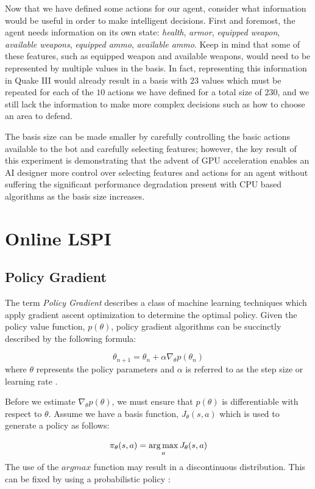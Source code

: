 Now that we have defined some actions for our agent, consider what information would be useful in order to make intelligent decisions. First and foremost, the agent needs information on its own state: \emph{health}, \emph{armor}, \emph{equipped weapon}, \emph{available weapons}, \emph{equipped ammo}, \emph{available ammo}. Keep in mind that some of these features, such as equipped weapon and available weapons, would need to be represented by multiple values in the basis. In fact, representing this information in Quake III would already result in a basis with $23$ values which must be repeated for each of the $10$ actions we have defined for a total size of $230$, and we still lack the information to make more complex decisions such as how to choose an area to defend.

The basis size can be made smaller by carefully controlling the basic actions available to the bot and carefully selecting features; however, the key result of this experiment is demonstrating that the advent of GPU acceleration enables an AI designer more control over selecting features and actions for an agent without suffering the significant performance degradation present with CPU based algorithms as the basis size increases.

\section{Online LSPI}

\subsection{Policy Gradient}

The term \emph{Policy Gradient} describes a class of machine learning techniques which apply gradient ascent optimization to determine the optimal policy. Given the policy value function, $p(\theta)$, policy gradient algorithms can be succinctly described by the following formula:

\[
    \theta_{n+1} = \theta_{n} + \alpha\nabla_\theta p(\theta_{n})
\]
where $\theta$ represents the policy parameters and $\alpha$ is referred to as the step size or learning rate \cite{norvig}\cite{bishop}.

Before we estimate $\nabla_\theta p(\theta)$, we must ensure that $p(\theta)$ is differentiable with respect to $\theta$. Assume we have a basis function, $J_\theta(s,a)$ which is used to generate a policy as follows:

\[
    \pi_\theta(s,a) = \operatorname*{arg\,max}_a J_\theta(s,a)
\]
The use of the $argmax$ function may result in a discontinuous distribution. This can be fixed by using a probabilistic policy \cite{olpomdp:lecture}:

